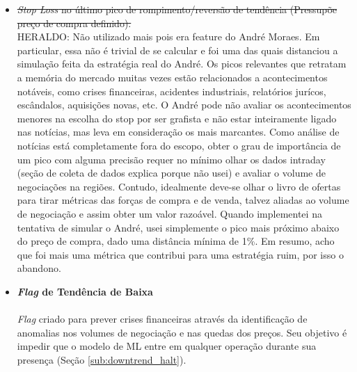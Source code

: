 \begin{itemize}
    \item \sout{\textit{Stop Loss} no último pico de rompimento/reversão de tendência (Pressupõe preço de compra definido).} \\
    \color{red} HERALDO: Não utilizado mais pois era feature do André Moraes. Em particular, essa não é trivial de se calcular e foi uma das quais distanciou a simulação feita da estratégia real do André. Os picos relevantes que retratam a memória do mercado muitas vezes estão relacionados a acontecimentos notáveis, como crises financeiras, acidentes industriais, relatórios jurícos, escândalos, aquisições novas, etc. O André pode não avaliar os acontecimentos menores na escolha do stop por ser grafista e não estar inteiramente ligado nas notícias, mas leva em consideração os mais marcantes. Como análise de notícias está completamente fora do escopo, obter o grau de importância de um pico com alguma precisão requer no mínimo olhar os dados intraday (seção de coleta de dados explica porque não usei) e avaliar o volume de negociações na regiões. Contudo, idealmente deve-se olhar o livro de ofertas para tirar métricas das forças de compra e de venda, talvez aliadas ao volume de negociação e assim obter um valor razoável. Quando implementei na tentativa de simular o André, usei simplemente o pico mais próximo abaixo do preço de compra, dado uma distância mínima de 1\%. Em resumo, acho que foi mais uma métrica que contribui para uma estratégia ruim, por isso o abandono. 


    \item \textbf{\textit{Flag} de Tendência de Baixa} \\ \\
    \textit{Flag} criado para prever crises financeiras através da identificação de anomalias nos volumes de negociação e nas quedas dos preços. Seu objetivo é impedir que o modelo de ML entre em qualquer operação durante sua presença (Seção \ref{sub:downtrend_halt}).


\end{itemize}
